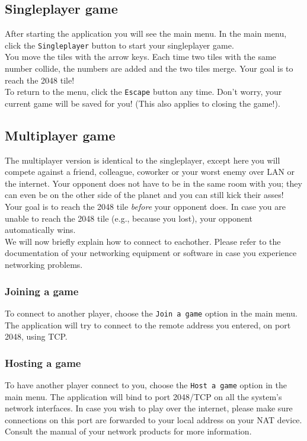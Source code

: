 \documentclass[a4paper,11pt,report]{scrartcl}
\begin{document}
\subsection{Singleplayer game}
After starting the application you will see the main menu. In the main menu,
click the \texttt{Singleplayer} button to start your singleplayer game.\\

You move the tiles with the arrow keys. Each time two tiles with the same
number collide, the numbers are added and the two tiles merge. Your goal is to
reach the 2048 tile!\\

To return to the menu, click the \texttt{Escape} button any time. Don't worry,
your current game will be saved for you! (This also applies to closing the
game!).

\subsection{Multiplayer game}
The multiplayer version is identical to the singleplayer, except here you will
compete against a friend, colleague, coworker or your worst enemy over LAN or
the internet. Your opponent does not have to be in the same room with you; they
can even be on the other side of the planet and you can still kick their
asses!\\

Your goal is to reach the 2048 tile \textit{before} your opponent does. In case you
are unable to reach the 2048 tile (e.g., because you lost), your opponent
automatically wins.\\

We will now briefly explain how to connect to eachother. Please refer to the
documentation of your networking equipment or software in case you experience
networking problems.

\subsubsection{Joining a game}
To connect to another player, choose the \texttt{Join a game} option in the
main menu. The application will try to connect to the remote address you
entered, on port 2048, using TCP.

\subsubsection{Hosting a game}
To have another player connect to you, choose the \texttt{Host a game} option
in the main menu. The application will bind to port 2048/TCP on all the
system's network interfaces. In case you wish to play over the internet,
please make sure connections on this port are forwarded to your local address
on your NAT device. Consult the manual of your network products for more 
information.
\end{document}
